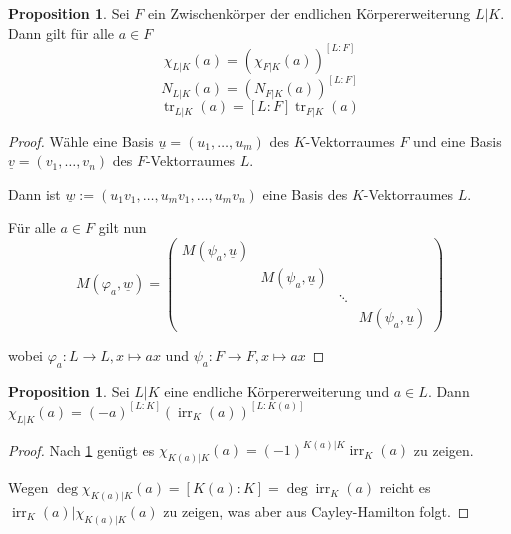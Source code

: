 \documentclass[
twoside=semi,
fontsize=12,
DIV=12, 
cleardoublepage=current,
leqno,
headings=optiontoheadandtoc, 
toc=idx
]{scrbook}
\DeclareMathOperator{\irr}{irr}
\DeclareMathOperator{\tr}{tr}
\theoremstyle{definition}
\newtheorem{proposition}[definition]{Proposition}
\begin{document}
	\begin{proposition}\label{2.4.4}\hfill\newline
		Sei $F$ ein Zwischenk\"orper der endlichen K\"orpererweiterung $L|K$. Dann gilt f\"ur alle $a \in F$
			\[\chi_{L|K}(a) = (\chi_{F|K}(a))^{[L:F]}\]
			\[N_{L|K}(a) = (N_{F|K}(a))^{[L:F]}\]
			\[\tr_{L|K}(a) = [L:F]\tr_{F|K}(a)\]
			
		\begin{proof}
			W\"ahle eine Basis $\underline{u} = (u_1, \dots, u_m)$ des $K$-Vektorraumes $F$ und eine Basis $\underline{v} = (v_1, \dots, v_n)$ des $F$-Vektorraumes $L$.
			
			Dann ist $\underline{w} := (u_1v_1, \dots, u_mv_1, \dots, u_mv_n)$ eine Basis des $K$-Vektorraumes $L$.
			
			F\"ur alle $a \in F$ gilt nun
				\[M(\varphi_{a}, \underline{w}) = \begin{pmatrix}
					M(\psi_a, \underline{u}) & & & \\
					& M(\psi_a, \underline{u}) & & \\
					& & \ddots & \\
					& & & M(\psi_a, \underline{u})
				\end{pmatrix}\]
			
			wobei $\varphi_a: L \to L, x \mapsto ax$ und $\psi_a: F \to F, x \mapsto ax$
		\end{proof}
	\end{proposition}
	
	\begin{proposition}\label{2.4.5}\hfill\newline
		Sei $L|K$ eine endliche K\"orpererweiterung und $a \in L$. Dann $\chi_{L|K}(a) = (-a)^{[L:K]}(\irr_K(a))^{[L:K(a)]}$
		
		\begin{proof}
			Nach \ref{2.4.4} gen\"ugt es $\chi_{K(a)|K}(a) = (-1)^{K(a)|K} \irr_K(a)$ zu zeigen.
			
			Wegen $\deg \chi_{K(a)|K}(a) = [K(a):K] = \deg \irr_K(a)$ reicht es $\irr_K(a)|\chi_{K(a)|K}(a)$ zu zeigen, was aber aus Cayley-Hamilton folgt.
		\end{proof}
	\end{proposition}
	
\end{document}
